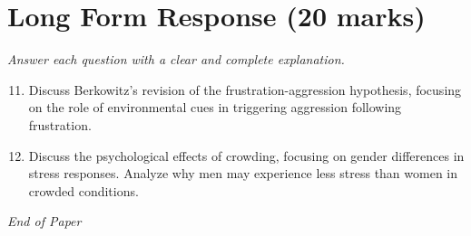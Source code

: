 \documentclass[12pt]{article}
\begin{document}
\section*{Long Form Response (20 marks)}
\textit{Answer each question with a clear and complete explanation.}
\begin{enumerate}[label=\arabic*.]
\setcounter{enumi}{10}
\item Discuss Berkowitz's revision of the frustration-aggression hypothesis, focusing on the role of environmental cues in triggering aggression following frustration.
\item Discuss the psychological effects of crowding, focusing on gender differences in stress responses. Analyze why men may experience less stress than women in crowded conditions.
\end{enumerate}

\vfill
\noindent\textit{End of Paper}
\end{document}
